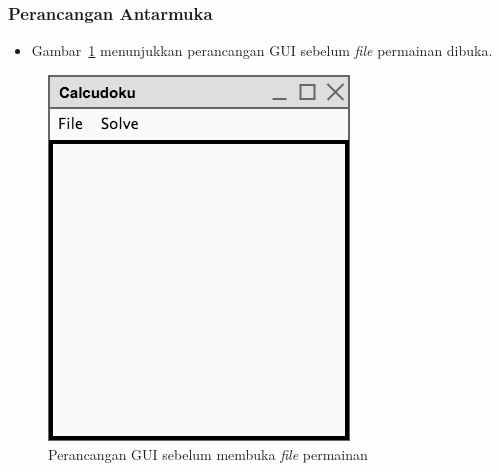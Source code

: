 \documentclass{beamer}
\begin{document}
\begin{frame}
\frametitle{Perancangan Antarmuka}
\begin{itemize}
\item Gambar~\ref{fig:perancangangui1} menunjukkan perancangan GUI sebelum \textit{file} permainan dibuka. 
\end{itemize}
\begin{figure}
\centering
\captionsetup{justification=centering}
\includegraphics[scale=0.4]{Gambar/Perancangan/PerancanganGUI1.png}
\caption[Perancangan GUI sebelum \textit{file} permainan dibuka.]{Perancangan GUI sebelum membuka \textit{file} permainan}
\label{fig:perancangangui1}
\end{figure}
\end{frame}

\end{document}
